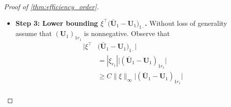 \documentclass[10pt]{article}
\newcommand{\0}{{\mathbf{0}}}
\newcommand{\1}{{\mathbf{1}}}
\newcommand{\U}{{\mathbf{U}}}
\renewcommand{\t}{^{\top}}
\begin{document}
\begin{proof}[Proof of \cref{thm:efficiency_order}]
\begin{itemize}
\begin{align*}
    \chi^2(f_{\pi_{\mathcal{H}_1}}, f_{\pi_{\mathcal{H}_0}}) + 1 &= \exp\bigg( \sum_{i,j,k} \frac{(\mathcal{\bar T}_{ijk} - \mathcal{T}_{ijk})^2}{\sigma^2_{ijk}} \bigg) \\
    &\leq \exp\bigg(  \| \mathcal{\bar T} - \mathcal{T} \|_F^2 \bigg) \\
    &\leq \exp\bigg( \|(\mathbf{\bar U}_1 - \U_1) \mathbf{\Lambda}_1 \mathbf{V}_1\t \|_F^2 \bigg) \\
    &\leq \exp\bigg( \|(\mathbf{\bar U}_1 - \U_1) \mathbf{\Lambda}_1  \|_F^2 \bigg) \\
    &\leq \exp\bigg( \lambda_{r_1}^2 \|(\U_1)_{\cdot r_1} - \mathbf{v} \|^2 \bigg),
\end{align*}
where we have used the assumption $\sigma_{\min} = 1$. 
We now bound the quantity inside the exponential. Observe that
\begin{align*}
    \| \big(\mathbf{U}_1\big)_{\cdot r_1} - \mathbf{v} \| &= \bigg\| \big(\mathbf{U}_1\big)_{\cdot r_1} - \frac{(\U_1)_{\cdot r_1} + \delta (\mathbf{I} - \U_1 \U_1\t ) e_1}{\sqrt{1 + \delta^2 \| (\mathbf{I} - \U_1 \U_1\t ) e_1 \|^2}} \bigg\| \\
    &\leq \delta \bigg\|\bigg( \mathbf{I} - \U_1 \U_1\t \bigg) e_1 \bigg\| \\
    &\quad + \bigg( 1 - \frac{1}{\sqrt{1 + \delta^2 \|(\mathbf{I} - \U_1 \U_1\t ) e_1\|}} \bigg) \| (\U_{1})_{\cdot r_1} + \delta (\mathbf{I} - \U_1 \U_1\t ) e_1 \| \\
    &\leq \delta  + \frac{\sqrt{1 + \delta^2\|(\mathbf{I} - \U_1 \U_1\t )e_i\|} - 1}{\sqrt{1 + \delta^2 \| (\mathbf{I} - \U_1 \U_1\t)e_1 \|^2}} (1 + \delta)  \\
    &\leq 3\delta ,
\end{align*}
where the final inequality holds as long as $\delta \leq \frac{1}{12}$.  Therefore,
\begin{align*}
\chi^2(f_{\pi_{\mathcal{H}_1}}, f_{\pi_{\mathcal{H}_0}}) &\leq \exp\bigg( 9\lambda_{r_1}^2 \delta^2 \bigg) - 1.
\end{align*}
\item \textbf{Step 3: Lower bounding $\xi\t (\mathbf{\bar U}_1 - \U_1 \big)_{1\cdot}$. } 
Without loss of generality assume that $(\U_1)_{1 r_1}$ is nonnegative.  Observe that
\begin{align*}
    |\xi\t& (\mathbf{\bar U}_1 - \U_1 \big)_{1\cdot}|\\ &= |\xi_{r_1}| \bigg| (\mathbf{\bar U}_1 - \U_1)_{1r_1} \bigg| \\
    &\geq C \| \xi\|_{\infty} \bigg| (\mathbf{\bar U}_1 - \U_1)_{1r_1} \bigg| \\

\end{align*}
\end{itemize}
\end{proof}
\end{document}
